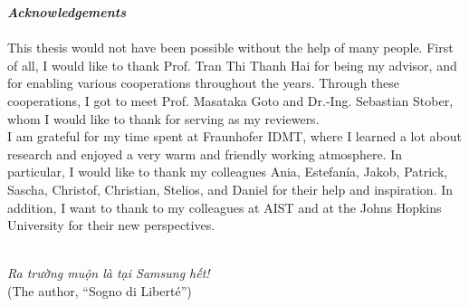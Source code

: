 
\newpage

\begin{verbatim}

\end{verbatim}

\textbf{\emph{Acknowledgements}}
\\\\

This thesis would not have been possible without the help of many people. First of all, I would like to thank Prof. Tran Thi Thanh Hai for being my advisor, and for enabling various cooperations throughout the years. Through these cooperations, I got to meet Prof. Masataka Goto and Dr.-Ing. Sebastian Stober, whom I would like to thank for serving as my reviewers.\\
I am grateful for my time spent at Fraunhofer IDMT, where I learned a lot about research and enjoyed a very warm and friendly working atmosphere. In particular, I would like to thank my colleagues Ania, Estefanía, Jakob, Patrick, Sascha, Christof, Christian, Stelios, and Daniel for their help and inspiration. In addition, I want to thank to my colleagues at AIST and at the Johns Hopkins University for their new perspectives.\\\\


\bigskip

\begin{otherlanguage}{vietnamese}
\begin{flushright}
\textit{Ra trường muộn là tại Samsung hết!}\\
(The author, ``Sogno di Liberté'')
\end{flushright}
\end{otherlanguage}





